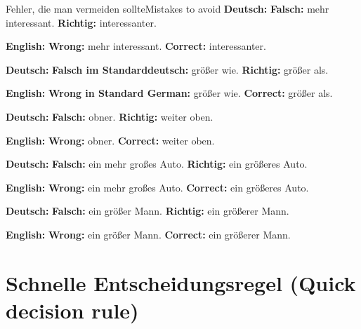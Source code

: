 \documentclass[a4paper,11pt]{article}
\newcommand{\GermanText}[1]{\textbf{Deutsch: }#1\par}
\newcommand{\EnglishText}[1]{{\small\color{SoftGray}\textbf{English: }#1\par}}
\begin{document}
\begin{grammarentry}{Fehler, die man vermeiden sollte}{Mistakes to avoid}
\GermanText{\textbf{Falsch:} mehr interessant. \quad \textbf{Richtig:} interessanter.}
\EnglishText{\textbf{Wrong:} mehr interessant. \quad \textbf{Correct:} interessanter.}

\GermanText{\textbf{Falsch im Standarddeutsch:} größer wie. \quad \textbf{Richtig:} größer als.}
\EnglishText{\textbf{Wrong in Standard German:} größer wie. \quad \textbf{Correct:} größer als.}

\GermanText{\textbf{Falsch:} obner. \quad \textbf{Richtig:} weiter oben.}
\EnglishText{\textbf{Wrong:} obner. \quad \textbf{Correct:} weiter oben.}

\GermanText{\textbf{Falsch:} ein mehr großes Auto. \quad \textbf{Richtig:} ein größeres Auto.}
\EnglishText{\textbf{Wrong:} ein mehr großes Auto. \quad \textbf{Correct:} ein größeres Auto.}

\GermanText{\textbf{Falsch:} ein größer Mann. \quad \textbf{Richtig:} ein größerer Mann.}
\EnglishText{\textbf{Wrong:} ein größer Mann. \quad \textbf{Correct:} ein größerer Mann.}
\end{grammarentry}

\section{Schnelle Entscheidungsregel \textnormal{(Quick decision rule)}}
\end{document}
